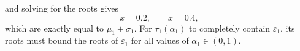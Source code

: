 \begin{example}
\begin{equation}
\end{equation}
and solving for the roots gives
\begin{equation}
    x = 0.2, \qquad x = 0.4,
\end{equation}
which are exactly equal to $\mu_1\pm\sigma_1$. For $\tau_1(\alpha_1)$ to completely contain $\varepsilon_1$, its roots
must bound the roots of $\varepsilon_1$ for all values of $\alpha_1\in(0,1)$.
\begin{figure}[tbp]
    \centering



\end{figure}
\end{example}
